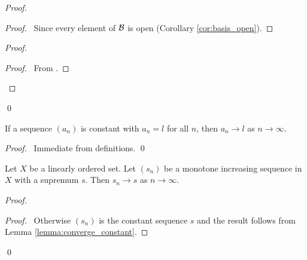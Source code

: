 \begin{proof}
    \pf
    \begin{proof}
        \pf\ Since every element of $\mathcal{B}$ is open (Corollary \ref{cor:basis_open}).
    \end{proof}
    \begin{proof}
        \begin{proof}
            \pf\ From .
        \end{proof}
    \end{proof}
    \qed
\end{proof}

\begin{lemma}
    \label{lemma:converge_constant}
    If a sequence $(a_n)$ is constant with $a_n = l$ for all $n$, then $a_n \rightarrow l$ as $n \rightarrow \infty$.
\end{lemma}

\begin{proof}
    \pf\ Immediate from definitions. \qed
\end{proof}

\begin{theorem}
    Let $X$ be a linearly ordered set. Let $(s_n)$ be a monotone increasing sequence in $X$ with a supremum $s$.
    Then $s_n \rightarrow s$ as $n \rightarrow \infty$.
\end{theorem}

\begin{proof}
    \pf
    \begin{proof}
        \pf\ Otherwise $(s_n)$ is the constant sequence $s$ and the result follows from Lemma \ref{lemma:converge_constant}.
    \end{proof}
    \step{3}{\pick{$a < s$ such that $(a,s] \subseteq U$}}
    \step{5}{For all $n \geq N$ we have $a_n \in (a,s]$}
    \qed
\end{proof}

